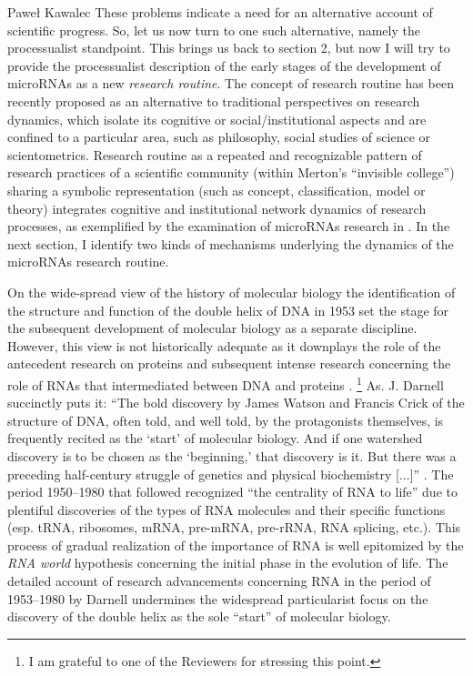 \begin{artengenv}{Paweł Kawalec}
These problems indicate a need for an alternative account of scientific progress. So, let us now turn to one such alternative, namely the processualist standpoint. This brings us back to section 2, but now I will try to provide the processualist description of the early stages of the development of microRNAs as a new \textit{research routine}. The concept of research routine has been recently proposed as an alternative to traditional perspectives on research dynamics, which isolate its cognitive or social/institutional aspects and are confined to a particular area, such as philosophy, social studies of science or scientometrics. Research routine as a repeated and recognizable pattern of research practices of a scientific community (within Merton's ``invisible college'') sharing a symbolic representation (such as concept, classification, model or theory) integrates cognitive and institutional network dynamics of research processes, as exemplified by the examination of microRNAs research in
\parencite[][]{kawalec_transformations_2018}. %
 In the next section, I identify two kinds of mechanisms underlying the dynamics of the microRNAs research routine.

On the wide-spread view of the history of molecular biology the identification of the structure and function of the double helix of DNA in 1953 set the stage for the subsequent development of molecular biology as a separate discipline. However, this view is not historically adequate as it downplays the role of the antecedent research on proteins and subsequent intense research concerning the role of RNAs that intermediated between DNA and proteins
\parencite[][]{garcia-sancho_biology_2012}.%
\footnote{I am grateful to one of the Reviewers for stressing this point.} As. J. Darnell succinctly puts it: ``The bold discovery by James Watson and Francis Crick of the structure of DNA, often told, and well told, by the protagonists themselves, is frequently recited as the ‘start' of molecular biology. And if one watershed discovery is to be chosen as the ‘beginning,' that discovery is it. But there was a preceding half-century struggle of genetics and physical biochemistry [...]'' 
\parencite[][p.2]{darnell_rna_2011}. %
 The period 1950–1980 that followed recognized ``the centrality of RNA to life'' due to plentiful discoveries of the types of RNA molecules and their specific functions (esp. tRNA, ribosomes, mRNA, pre-mRNA, pre-rRNA, RNA splicing, etc.). This process of gradual realization of the importance of RNA is well epitomized by the \textit{RNA world} hypothesis concerning the initial phase in the evolution of life. The detailed account of research advancements concerning RNA in the period of 1953–1980 by Darnell 
\parencite*[][]{darnell_rna_2011} %
 undermines the widespread particularist focus on the discovery of the double helix as the sole ``start'' of molecular biology.


\end{artengenv}

